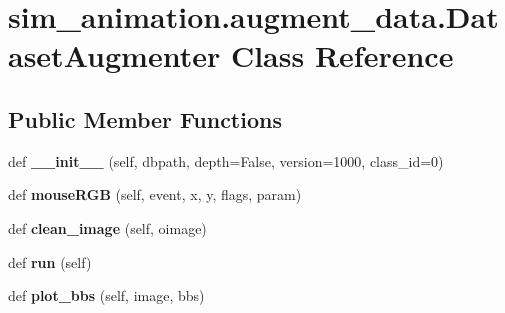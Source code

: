 \hypertarget{classsim__animation_1_1augment__data_1_1DatasetAugmenter}{}\section{sim\+\_\+animation.\+augment\+\_\+data.\+Dataset\+Augmenter Class Reference}
\label{classsim__animation_1_1augment__data_1_1DatasetAugmenter}
\subsection*{Public Member Functions}
\begin{DoxyCompactItemize}
\item 
\mbox{\label{classsim__animation_1_1augment__data_1_1DatasetAugmenter_aadf3c7ff5947684ccb8ab5d35b36915d}} 
def {\bfseries \+\_\+\+\_\+init\+\_\+\+\_\+} (self, dbpath, depth=False, version=1000, class\+\_\+id=\textquotesingle{}0\textquotesingle{})
\item 
\mbox{\label{classsim__animation_1_1augment__data_1_1DatasetAugmenter_a812671b278871099f7881288a1682670}} 
def {\bfseries mouse\+R\+GB} (self, event, x, y, flags, param)
\item 
\mbox{\label{classsim__animation_1_1augment__data_1_1DatasetAugmenter_af40b49e42609281fa49b792cad368763}} 
def {\bfseries clean\+\_\+image} (self, oimage)
\item 
\mbox{\label{classsim__animation_1_1augment__data_1_1DatasetAugmenter_a8703895fc60258c32f0bacee7cafb494}} 
def {\bfseries run} (self)
\item 
\mbox{\label{classsim__animation_1_1augment__data_1_1DatasetAugmenter_a66248b589f77d3879c14d7bb4618ddf6}} 
def {\bfseries plot\+\_\+bbs} (self, image, bbs)
\end{DoxyCompactItemize}
